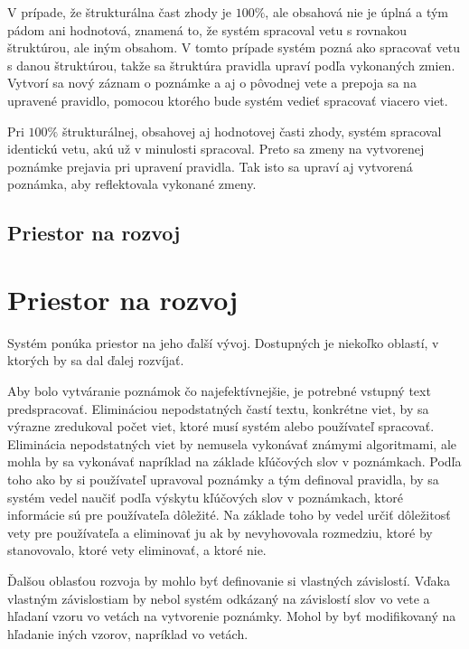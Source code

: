 V prípade, že štrukturálna čast zhody je $100\%$, ale obsahová nie je úplná a tým pádom ani hodnotová, znamená to, že systém spracoval vetu s rovnakou štruktúrou, ale iným obsahom. V tomto prípade systém pozná ako spracovať vetu s danou štruktúrou, takže sa štruktúra pravidla upraví podľa vykonaných zmien. Vytvorí sa nový záznam o poznámke a aj o pôvodnej vete a prepoja sa na upravené pravidlo, pomocou ktorého bude systém vedieť spracovať viacero viet.

Pri $100\%$ štrukturálnej, obsahovej aj hodnotovej časti zhody, systém spracoval identickú vetu, akú už v minulosti spracoval. Preto sa zmeny na vytvorenej poznámke prejavia pri upravení pravidla. Tak isto sa upraví aj vytvorená poznámka, aby reflektovala vykonané zmeny.

%
%
{
	\subsection{Priestor na rozvoj}
}
{
	\section{Priestor na rozvoj}
}
\label{subsection:system_continue}
Systém ponúka priestor na jeho ďalší vývoj. Dostupných je niekoľko oblastí, v ktorých by sa dal ďalej rozvíjať.

Aby bolo vytváranie poznámok čo najefektívnejšie, je potrebné vstupný text predspracovať. Elimináciou nepodstatných častí textu, konkrétne viet, by sa výrazne zredukoval počet viet, ktoré musí systém alebo používateľ spracovať. Eliminácia nepodstatných viet by nemusela vykonávať známymi algoritmami, ale mohla by sa vykonávať napríklad na základe kľúčových slov v poznámkach. Podľa toho ako by si používateľ upravoval poznámky a tým definoval pravidla, by sa systém vedel naučiť podľa výskytu kľúčových slov v poznámkach, ktoré informácie sú pre používateľa dôležité. Na základe toho by vedel určiť dôležitosť vety pre používateľa a eliminovať ju ak by nevyhovovala rozmedziu, ktoré by stanovovalo, ktoré vety eliminovať, a ktoré nie.

Ďalšou oblasťou rozvoja by mohlo byť definovanie si vlastných závislostí. Vďaka vlastným závislostiam by nebol systém odkázaný na závislostí slov vo vete a hľadaní vzoru vo vetách na vytvorenie poznámky. Mohol by byť modifikovaný na hľadanie iných vzorov, napríklad vo vetách.

